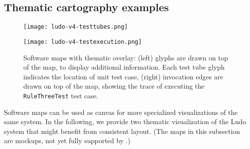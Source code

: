 \subsection{Thematic cartography examples}

\begin{figure}
\begin{center}
\begin{minipage}{1.4\figwidth}
\begin{center}
  \texttt{[image: ludo-v4-testtubes.png]}
\end{center}
\end{minipage}
\begin{minipage}{1.4\figwidth}
\begin{center}
  \texttt{[image: ludo-v4-testexecution.png]}
\end{center}
\end{minipage}
\end{center}
    \caption{Software maps with thematic overlay: (left) glyphs are drawn on top of the map, to display additional information. Each test tube glyph indicates the location of unit test case, (right) invocation edges are drawn on top of the map, showing the trace of executing the {\tt RuleThreeTest} test case.}
    \label{fig:mock}
\end{figure}

Software maps can be used as canvas for more specialized visualizations of the same system. In the following, we provide two thematic visualization of the Ludo system that might benefit from consistent layout. (The maps in this subsection are mockups, not yet fully supported by \TOOL.)

